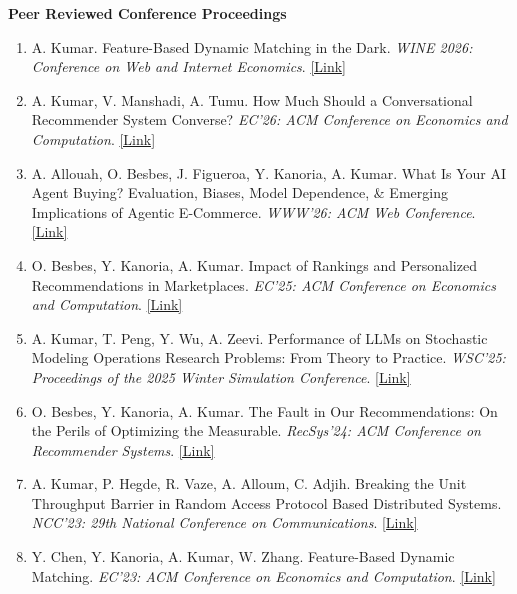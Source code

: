 \documentclass[11pt,letterpaper]{article}
\newcommand{\cvsubsection}[1]{%
  \Needspace{6\baselineskip}%
  \vspace{0.85em}%
  {\bfseries #1}\par
  \vspace{0.35em}%
}
\newenvironment{cvpubs}{%
  \begin{enumerate}[
    leftmargin=0.75in,
    labelwidth=0.28in,
    labelsep=0.22in,
    align=left,
    itemsep=0.62em,
    topsep=0.15em,
    parsep=0pt
  ]
}{\end{enumerate}}
\begin{document}
\cvsubsection{Peer Reviewed Conference Proceedings}
\begin{cvpubs}
  \item A. Kumar. Feature-Based Dynamic Matching in the Dark. \textit{WINE 2026: Conference on Web and Internet Economics}. \href{https://papers.ssrn.com/sol3/papers.cfm?abstract_id=6839679}{[Link]}

  \item A. Kumar, V. Manshadi, A. Tumu. How Much Should a Conversational Recommender System Converse? \textit{EC'26: ACM Conference on Economics and Computation}. \href{https://papers.ssrn.com/sol3/papers.cfm?abstract_id=6481459}{[Link]}

  \item A. Allouah, O. Besbes, J. Figueroa, Y. Kanoria, A. Kumar. What Is Your AI Agent Buying? Evaluation, Biases, Model Dependence, \& Emerging Implications of Agentic \mbox{E-Commerce}. \textit{WWW'26: ACM Web Conference}. \href{https://dl.acm.org/doi/10.1145/3774904.3792943}{[Link]}

  \item O. Besbes, Y. Kanoria, A. Kumar. Impact of Rankings and Personalized Recommendations in Marketplaces. \textit{EC'25: ACM Conference on Economics and Computation}. \href{https://dl.acm.org/doi/10.1145/3736252.3742547}{[Link]}

  \item A. Kumar, T. Peng, Y. Wu, A. Zeevi. Performance of LLMs on Stochastic Modeling Operations Research Problems: From Theory to Practice. \textit{WSC'25: Proceedings of the 2025 Winter Simulation Conference}. \href{https://www.informs-sim.org/wsc25papers/con281.pdf}{[Link]}

  \item O. Besbes, Y. Kanoria, A. Kumar. The Fault in Our Recommendations: On the Perils of Optimizing the Measurable. \textit{RecSys'24: ACM Conference on Recommender Systems}. \href{https://dl.acm.org/doi/10.1145/3640457.3688144}{[Link]}

  \item A. Kumar, P. Hegde, R. Vaze, A. Alloum, C. Adjih. Breaking the Unit Throughput Barrier in Random Access Protocol Based Distributed Systems. \textit{NCC'23: 29th National Conference on Communications}. \href{https://ieeexplore.ieee.org/document/10068073}{[Link]}

  \item Y. Chen, Y. Kanoria, A. Kumar, W. Zhang. Feature-Based Dynamic Matching. \textit{EC'23: ACM Conference on Economics and Computation}. \href{https://dl.acm.org/doi/10.1145/3580507.3597797}{[Link]}


\end{cvpubs}
\end{document}
